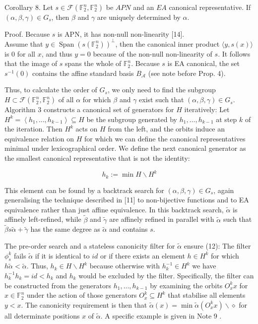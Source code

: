 \documentclass[10pt]{article}
\begin{document}
Corollary 8. Let $s \in \mathcal{F}\left(\mathbb{F}_{2}^{n}, \mathbb{F}_{2}^{n}\right)$ be $A P N$ and an $E A$ canonical representative. If $(\alpha, \beta, \gamma) \in G_{s}$, then $\beta$ and $\gamma$ are uniquely determined by $\alpha$.

Proof. Because $s$ is APN, it has non-null non-linearity [14].\\
Assume that $y \in \operatorname{Span}\left(s\left(\mathbb{F}_{2}^{n}\right)\right)^{\perp}$, then the canonical inner product $\langle y, s(x)\rangle$ is 0 for all $x$, and thus $y=0$ because of the non-null non-linearity of $s$. It follows that the image of $s$ spans the whole of $\mathbb{F}_{2}^{n}$. Because $s$ is EA canonical, the set $s^{-1}(0)$ contains the affine standard basis $B_{\mathcal{A}}$ (see note before Prop. 4).

Thus, to calculate the order of $G_{s}$, we only need to find the subgroup $H \subset \mathcal{F}\left(\mathbb{F}_{2}^{n}, \mathbb{F}_{2}^{n}\right)$ of all $\alpha$ for which $\beta$ and $\gamma$ exist such that $(\alpha, \beta, \gamma) \in G_{s}$. Algorithm 3 constructs a canonical set of generators for $H$ iteratively: Let $H^{k}= \left\langle h_{1}, \ldots, h_{k-1}\right\rangle \subseteq H$ be the subgroup generated by $h_{1}, \ldots, h_{k-1}$ at step $k$ of the iteration. Then $H^{k}$ acts on $H$ from the left, and the orbits induce an equivalence relation on $H$ for which we can define the canonical representatives minimal under lexicographical order. We define the next canonical generator as the smallest canonical representative that is not the identity:


\begin{equation*}
h_{k}:=\min H \backslash H^{k} \tag{12}
\end{equation*}


This element can be found by a backtrack search for $(\alpha, \beta, \gamma) \in G_{s}$, again generalising the technique described in [11] to non-bijective functions and to EA equivalence rather than just affine equivalence. In this backtrack search, $\tilde{\alpha}$ is affinely left-refined, while $\tilde{\beta}$ and $\tilde{\gamma}$ are affinely refined in parallel with $\tilde{\alpha}$ such that $\tilde{\beta} s \tilde{\alpha}+\tilde{\gamma}$ has the same degree as $\tilde{\alpha}$ and contains $s$.

The pre-order search and a stateless canonicity filter for $\tilde{\alpha}$ ensure (12): The filter $\phi_{s}^{k}$ fails $\tilde{\alpha}$ if it is identical to $i d$ or if there exists an element $h \in H^{k}$ for which $h \tilde{\alpha}<\tilde{\alpha}$. Thus, $h_{k} \in H \backslash H^{k}$ because otherwise with $h_{k}^{-1} \in H^{k}$ we have $h_{k}^{-1} h_{k}=i d<h_{k}$ and $h_{k}$ would be excluded by the filter. Specifically, the filter can be constructed from the generators $h_{1}, \ldots, h_{k-1}$ by examining the orbits $O_{x}^{k} x$ for $x \in \mathbb{F}_{2}^{n}$ under the action of those generators $O_{x}^{k} \subseteq H^{k}$ that stabilise all elements $y<x$. The canonicity requirement is then that $\tilde{\alpha}(x)=\min \tilde{\alpha}\left(O_{x}^{k} x\right) \backslash \diamond$ for all determinate positions $x$ of $\tilde{\alpha}$. A specific example is given in Note 9 .
\end{document}
